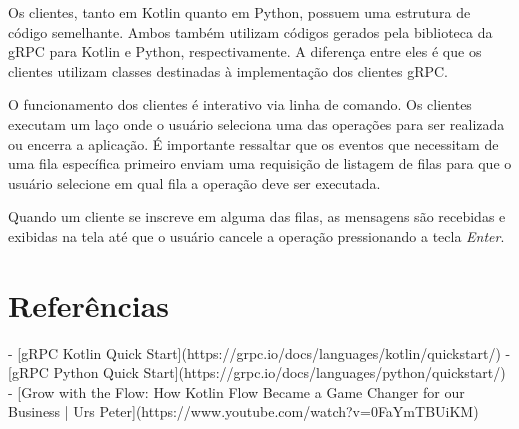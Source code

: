 \documentclass{article}
\begin{document}
Os clientes, tanto em Kotlin quanto em Python, possuem uma estrutura de código semelhante. Ambos também utilizam 
códigos gerados pela biblioteca da gRPC para Kotlin e Python, respectivamente. A diferença entre eles é que os clientes
utilizam classes destinadas à implementação dos clientes gRPC.

O funcionamento dos clientes é interativo via linha de comando. Os clientes executam um laço onde o usuário seleciona 
uma das operações para ser realizada ou encerra a aplicação. É importante ressaltar que os eventos que necessitam
de uma fila específica primeiro enviam uma requisição de listagem de filas para que o usuário selecione
em qual fila a operação deve ser executada.

Quando um cliente se inscreve em alguma das filas, as mensagens são recebidas e exibidas na tela 
até que o usuário cancele a operação pressionando a tecla \textit{Enter}.

\section{Referências}

- [gRPC Kotlin Quick Start](https://grpc.io/docs/languages/kotlin/quickstart/)
- [gRPC Python Quick Start](https://grpc.io/docs/languages/python/quickstart/)
- [Grow with the Flow: How Kotlin Flow Became a Game Changer for our Business | Urs Peter](https://www.youtube.com/watch?v=0FaYmTBUiKM)
\end{document}
